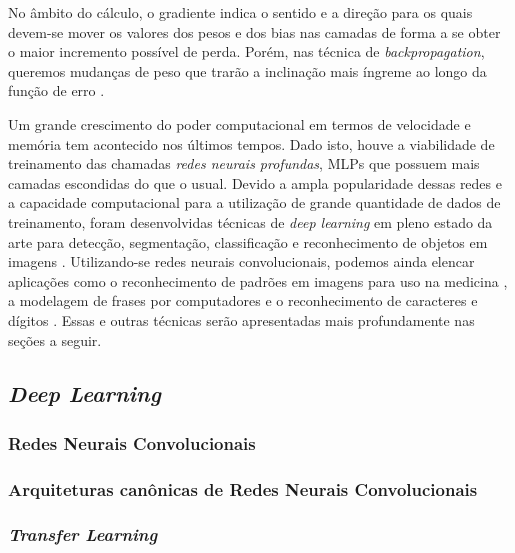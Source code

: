 No âmbito do cálculo, o gradiente indica o sentido e a direção para os quais devem-se mover os valores dos pesos e dos bias nas camadas de forma a se obter o maior incremento possível de perda. Porém, nas técnica de \emph{backpropagation}, queremos mudanças de peso que trarão a inclinação mais íngreme ao longo da função de erro \cite{goodfellow, kubat}.

Um grande crescimento do poder computacional em termos de velocidade e memória tem acontecido nos últimos tempos. Dado isto, houve a viabilidade de treinamento das chamadas \emph{redes neurais profundas}, MLPs que possuem mais camadas escondidas do que o usual. Devido a ampla popularidade dessas redes e a capacidade computacional para a utilização de grande quantidade de dados de treinamento, foram desenvolvidas técnicas de \emph{deep learning} em pleno estado da arte para detecção, segmentação, classificação e reconhecimento de objetos em imagens \cite{khan}. Utilizando-se redes neurais convolucionais, podemos ainda elencar aplicações como o reconhecimento de padrões em imagens para uso na medicina \cite{cha}, a modelagem de frases por computadores \cite{kalchbrenner} e o reconhecimento de caracteres e dígitos \cite{lecun}. Essas e outras técnicas serão apresentadas mais profundamente nas seções a seguir.



\subsection{\emph{Deep Learning}}
\label{subsec:dl}

\subsubsection{Redes Neurais Convolucionais}
\label{subsubsec:cnns}



\subsubsection{Arquiteturas canônicas de Redes Neurais Convolucionais}
\label{subsubsec:arq-cnns}

\subsubsection{\emph{Transfer Learning}}
\label{subsubsec:transfer}
